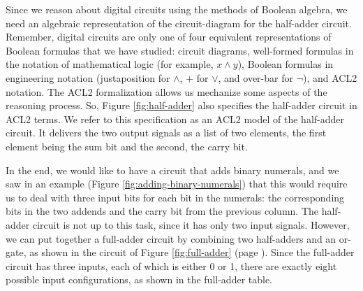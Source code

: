 Since we reason about digital circuits using the methods
of Boolean algebra, we need an algebraic representation
of the circuit-diagram for the half-adder circuit.
Remember, digital circuits are only one of four
equivalent representations of Boolean formulas that
we have studied: circuit diagrams, well-formed formulas
in the notation of mathematical logic (for example, $x \wedge y$),
Boolean formulas in engineering notation (justaposition for $\wedge$,
$+$ for $\vee$, and over-bar for $\neg$), and ACL2 notation.
The ACL2 formalization allows us mechanize some aspects of the reasoning process.
So, Figure \ref{fig:half-adder} also specifies the half-adder circuit in ACL2 terms.
We refer to this specification as an
ACL2 model of the half-adder circuit.
It delivers the two output signals as a list of two elements,
the first element being the sum bit and the second, the carry bit.

In the end, we would like to have a circuit
that adds binary numerals,
and we saw in an example (Figure \ref{fig:adding-binary-numerals})
that this would require us to deal with three input bits
for each bit in the numerals:
the corresponding bits in the two addends
and the carry bit from the previous column.
The half-adder circuit is not up to this task,
since it has only two input signals.
However, we can put together a full-adder circuit
by combining two half-adders and an or-gate,
as shown in the circuit of Figure \ref{fig:full-adder}
(page \pageref{fig:full-adder}).
Since the full-adder circuit has three inputs,
each of which is either 0 or 1,
there are exactly eight possible input configurations,
as shown in the full-adder table.

